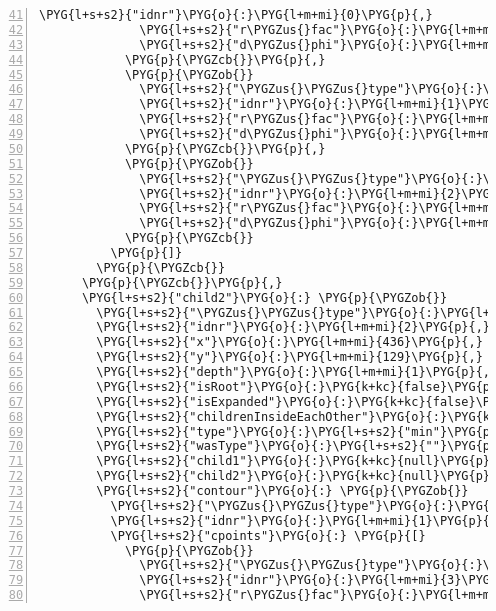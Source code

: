 \begin{Verbatim}[commandchars=\\\{\},numbers=left,firstnumber=41,stepnumber=1,codes={\catcode`\$=3\catcode`\^=7\catcode`\_=8}]
              \PYG{l+s+s2}{"idnr"}\PYG{o}{:}\PYG{l+m+mi}{0}\PYG{p}{,}
              \PYG{l+s+s2}{"r\PYGZus{}fac"}\PYG{o}{:}\PYG{l+m+mf}{0.625}\PYG{p}{,}
              \PYG{l+s+s2}{"d\PYGZus{}phi"}\PYG{o}{:}\PYG{l+m+mf}{1.5708}
            \PYG{p}{\PYGZcb{}}\PYG{p}{,}
            \PYG{p}{\PYGZob{}}
              \PYG{l+s+s2}{"\PYGZus{}\PYGZus{}type"}\PYG{o}{:}\PYG{l+s+s2}{"cpnt"}\PYG{p}{,}
              \PYG{l+s+s2}{"idnr"}\PYG{o}{:}\PYG{l+m+mi}{1}\PYG{p}{,}
              \PYG{l+s+s2}{"r\PYGZus{}fac"}\PYG{o}{:}\PYG{l+m+mf}{0.5}\PYG{p}{,}
              \PYG{l+s+s2}{"d\PYGZus{}phi"}\PYG{o}{:}\PYG{l+m+mf}{3.1416}
            \PYG{p}{\PYGZcb{}}\PYG{p}{,}
            \PYG{p}{\PYGZob{}}
              \PYG{l+s+s2}{"\PYGZus{}\PYGZus{}type"}\PYG{o}{:}\PYG{l+s+s2}{"cpnt"}\PYG{p}{,}
              \PYG{l+s+s2}{"idnr"}\PYG{o}{:}\PYG{l+m+mi}{2}\PYG{p}{,}
              \PYG{l+s+s2}{"r\PYGZus{}fac"}\PYG{o}{:}\PYG{l+m+mf}{0.625}\PYG{p}{,}
              \PYG{l+s+s2}{"d\PYGZus{}phi"}\PYG{o}{:}\PYG{l+m+mf}{4.7124}
            \PYG{p}{\PYGZcb{}}
          \PYG{p}{]}
        \PYG{p}{\PYGZcb{}}
      \PYG{p}{\PYGZcb{}}\PYG{p}{,}
      \PYG{l+s+s2}{"child2"}\PYG{o}{:} \PYG{p}{\PYGZob{}}
        \PYG{l+s+s2}{"\PYGZus{}\PYGZus{}type"}\PYG{o}{:}\PYG{l+s+s2}{"extpnt"}\PYG{p}{,}
        \PYG{l+s+s2}{"idnr"}\PYG{o}{:}\PYG{l+m+mi}{2}\PYG{p}{,}
        \PYG{l+s+s2}{"x"}\PYG{o}{:}\PYG{l+m+mi}{436}\PYG{p}{,}
        \PYG{l+s+s2}{"y"}\PYG{o}{:}\PYG{l+m+mi}{129}\PYG{p}{,}
        \PYG{l+s+s2}{"depth"}\PYG{o}{:}\PYG{l+m+mi}{1}\PYG{p}{,}
        \PYG{l+s+s2}{"isRoot"}\PYG{o}{:}\PYG{k+kc}{false}\PYG{p}{,}
        \PYG{l+s+s2}{"isExpanded"}\PYG{o}{:}\PYG{k+kc}{false}\PYG{p}{,}
        \PYG{l+s+s2}{"childrenInsideEachOther"}\PYG{o}{:}\PYG{k+kc}{false}\PYG{p}{,}
        \PYG{l+s+s2}{"type"}\PYG{o}{:}\PYG{l+s+s2}{"min"}\PYG{p}{,}
        \PYG{l+s+s2}{"wasType"}\PYG{o}{:}\PYG{l+s+s2}{""}\PYG{p}{,}
        \PYG{l+s+s2}{"child1"}\PYG{o}{:}\PYG{k+kc}{null}\PYG{p}{,}
        \PYG{l+s+s2}{"child2"}\PYG{o}{:}\PYG{k+kc}{null}\PYG{p}{,}
        \PYG{l+s+s2}{"contour"}\PYG{o}{:} \PYG{p}{\PYGZob{}}
          \PYG{l+s+s2}{"\PYGZus{}\PYGZus{}type"}\PYG{o}{:}\PYG{l+s+s2}{"contour"}\PYG{p}{,}
          \PYG{l+s+s2}{"idnr"}\PYG{o}{:}\PYG{l+m+mi}{1}\PYG{p}{,}
          \PYG{l+s+s2}{"cpoints"}\PYG{o}{:} \PYG{p}{[}
            \PYG{p}{\PYGZob{}}
              \PYG{l+s+s2}{"\PYGZus{}\PYGZus{}type"}\PYG{o}{:}\PYG{l+s+s2}{"cpnt"}\PYG{p}{,}
              \PYG{l+s+s2}{"idnr"}\PYG{o}{:}\PYG{l+m+mi}{3}\PYG{p}{,}
              \PYG{l+s+s2}{"r\PYGZus{}fac"}\PYG{o}{:}\PYG{l+m+mf}{0.625}\PYG{p}{,}
\end{Verbatim}
